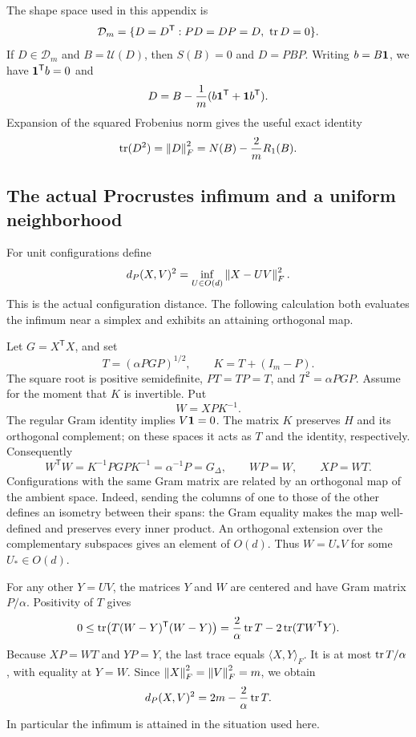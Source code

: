 The shape space used in this appendix is
\[
 \mathcal D_m=\{D=D^{\mathsf T}:PD=DP=D,\ \operatorname{tr} D=0\}.
\]
If $D\in\mathcal D_m$ and $B=\mathcal U(D)$, then $S(B)=0$ and $D=PBP$.
Writing $b=B\mathbf 1$, we have $\mathbf 1^{\mathsf T}b=0$ and
\[
 D=B-\frac1m(b\mathbf 1^{\mathsf T}+\mathbf 1 b^{\mathsf T}).
\]
Expansion of the squared Frobenius norm gives the useful exact identity
\begin{equation}\label{ng:metric-identity}
 \operatorname{tr}(D^2)=\left\lVert D\right\rVert_F^2
       =N(B)-\frac2mR_1(B).
\end{equation}

\subsection{The actual Procrustes infimum and a uniform neighborhood}
\label{ng:procrustes}

For unit configurations define
\[
 d_P(X,V)^2=\inf_{U\in O(d)}\left\lVert X-UV\right\rVert_F^2.
\]
This is the actual configuration distance. The following calculation
both evaluates the infimum near a simplex and exhibits an attaining
orthogonal map.

Let $G=X^{\mathsf T}X$, and set
\begin{equation}\label{ng:root}
 T=(\alpha PGP)^{1/2},\qquad K=T+(I_m-P).
\end{equation}
The square root is positive semidefinite, $PT=TP=T$, and $T^2=\alpha PGP$.
Assume for the moment that $K$ is invertible. Put
\[
 W=XPK^{-1}.
\]
The regular Gram identity implies $V\mathbf 1=0$.
The matrix $K$ preserves $H$ and its orthogonal complement; on these
spaces it acts as $T$ and the identity, respectively. Consequently
\[
 W^{\mathsf T}W
 =K^{-1}PGPK^{-1}=\alpha^{-1}P=G_\Delta,
 \qquad WP=W,\qquad XP=WT.
\]
Configurations with the same Gram matrix are related by an orthogonal
map of the ambient space. Indeed, sending the columns of one to those
of the other defines an isometry between their spans: the Gram equality
makes the map well-defined and preserves every inner product.
An orthogonal extension over the complementary subspaces gives an element
of $O(d)$. Thus $W=U_*V$ for some $U_*\in O(d)$.

For any other $Y=UV$, the matrices $Y$ and $W$ are centered and have Gram
matrix $P/\alpha$. Positivity of $T$ gives
\[
 0\le\operatorname{tr}\!\left(T(W-Y)^{\mathsf T}(W-Y)\right)
   =\frac2\alpha\operatorname{tr} T-2\operatorname{tr}(TW^{\mathsf T}Y).
\]
Because $XP=WT$ and $YP=Y$, the last trace equals
$\langle X,Y\rangle_F$. It is at most $\operatorname{tr} T/\alpha$,
with equality at $Y=W$. Since $\left\lVert X\right\rVert_F^2=\left\lVert V\right\rVert_F^2=m$, we obtain
\begin{equation}\label{ng:distance}
 d_P(X,V)^2=2m-\frac2\alpha\operatorname{tr} T.
\end{equation}
In particular the infimum is attained in the situation used here.

